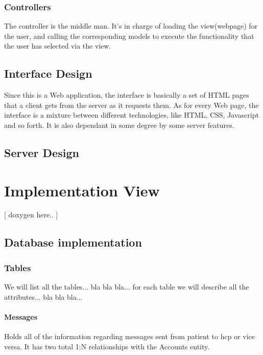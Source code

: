 \documentclass[12pt]{report}
\begin{document}
\subsection{Controllers}
The controller is the middle man. It's in charge of loading the view(webpage) for the user, and calling the corresponding models to execute the functionality that the user has selected via the view. 

\section{Interface Design}
Since this is a Web application, the interface is basically a set of HTML pages that a client gets from the server as it requests them. As for every Web page, the interface is a mixture between different technologies, like HTML, CSS, Javascript and so forth. It is also dependant in some degree by some server features.

\section{Server Design}



\chapter{Implementation View}
[ doxygen here.. ]

\section{Database implementation}
\subsection{Tables}
We will list all the tables... bla bla bla... for each table we will describe all the attributes... bla bla bla...

\subsubsection{Messages}
Holds all of the information regarding messages sent from patient to hcp or vice versa. It has two total 1:N relationships with the Accounts entity.
\end{document}
